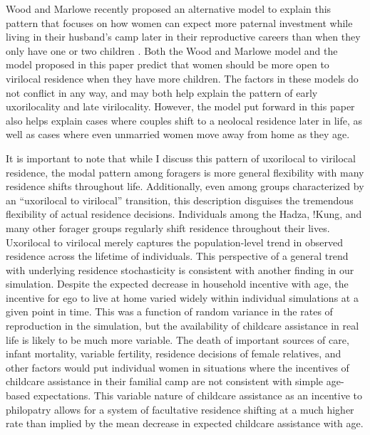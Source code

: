 Wood and Marlowe recently proposed an alternative model to explain this pattern that focuses on how women can expect more paternal investment while living in their husband's camp later in their reproductive careers than when they only have one or two children \cite{wood2011dynamics}.  Both the Wood and Marlowe model and the model proposed in this paper predict that women should be more open to virilocal residence when they have more children.  The factors in these models do not conflict in any way, and may both help explain the pattern of early uxorilocality and late virilocality.  However, the model put forward in this paper also helps explain cases where couples shift to a neolocal residence later in life, as well as cases where even unmarried women move away from home as they age. 

It is important to note that while I discuss this pattern of uxorilocal to virilocal residence, the modal pattern among foragers is more general flexibility with many residence shifts throughout life. Additionally, even among groups characterized by an “uxorilocal to virilocal” transition, this description disguises the tremendous flexibility of actual residence decisions.  Individuals among the Hadza, !Kung, and many other forager groups regularly shift residence throughout their lives.  Uxorilocal to virilocal merely captures the population-level trend in observed residence across the lifetime of individuals.  This perspective of a general trend with underlying residence stochasticity is consistent with another finding in our simulation.  Despite the expected decrease in household incentive with age, the incentive for ego to live at home varied widely within individual simulations at a given point in time.  This was a function of random variance in the rates of reproduction in the simulation, but the availability of childcare assistance in real life is likely to be much more variable.  The death of important sources of care, infant mortality, variable fertility, residence decisions of female relatives, and other factors would put individual women in situations where the incentives of childcare assistance in their familial camp are not consistent with simple age-based expectations.  This variable nature of childcare assistance as an incentive to philopatry allows for a system of facultative residence shifting at a much higher rate than implied by the mean decrease in expected childcare assistance with age.   

